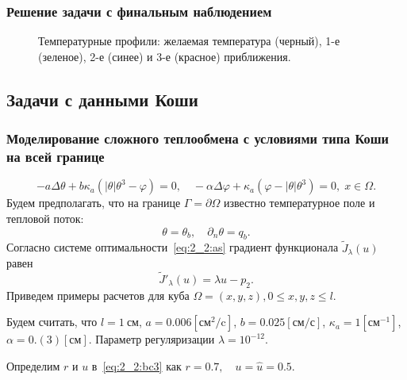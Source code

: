 \begin{frame}
    \frametitle{Решение задачи с финальным наблюдением}
    \begin{figure}[h!t]
        \caption{Температурные профили: желаемая температура (черный),
            1-е (зеленое), 2-е (синее) и 3-е (красное) приближения.}
        \label{fig:4_3:7}
    \end{figure}
\end{frame}

\subsection{Задачи с данными Коши}\label{subsec:koshi}
\begin{frame}
    \frametitle{Моделирование сложного теплообмена
    с условиями типа Коши на всей границе}
    \[
        - a\Delta\theta + b\kappa_a(|\theta|\theta^3- \varphi)=0,
        \quad -\alpha \Delta \varphi
        + \kappa_a(\varphi-|\theta|\theta^3)=0,\; x\in\Omega.
    \]
    Будем предполагать, что на границе $\Gamma = \partial \Omega$ известно
    температурное поле и тепловой поток:
    \[
        \theta = \theta_b,\quad \partial_n\theta = q_b.
    \]
    Согласно системе оптимальности~\eqref{eq:2_2:as} градиент функционала $\tilde J_\lambda(u)$ равен
    \[
        \tilde J'_\lambda (u) = \lambda u - p_2.
    \]
    Приведем примеры расчетов для куба $\Omega = {(x, y, z), 0 \leq x,y,z \leq l}$.

    Будем считать, что $l=1~\text{см}$, $a = 0.006[\text{см}^2/\text{c}]$,
    $b=0.025[\text{см}/\text{с}]$, $\kappa_a=1[\text{см}^{-1}]$, $\alpha = 0.(3)[\text{см}]$.
    Параметр регуляризации $\lambda=10^{-12}$.

    Определим $r$ и $u$ в~\eqref{eq:2_2:bc3} как $r = 0.7, \quad u = \hat u = 0.5$.
\end{frame}

